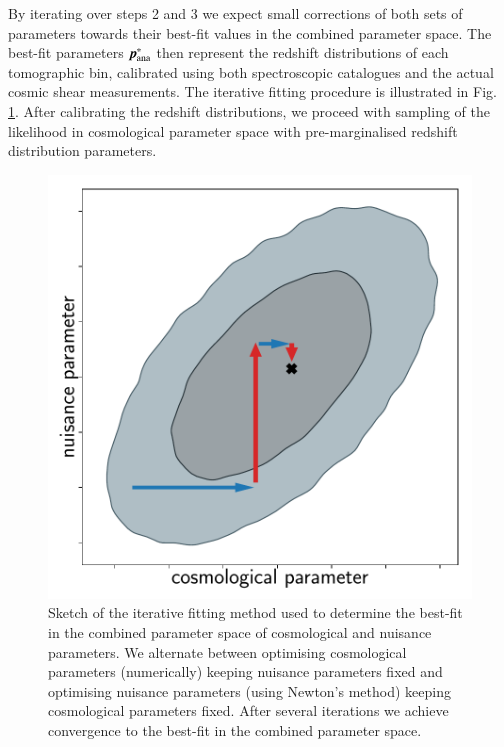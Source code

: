 \documentclass{aa}
\begin{document}
By iterating over steps 2 and 3 we expect small corrections of both sets of parameters towards their best-fit values in the combined parameter space. The best-fit parameters $\boldsymbol{p}^*_{\rm ana}$ then represent the redshift distributions of each tomographic bin, calibrated using both spectroscopic catalogues and the actual cosmic shear measurements. The iterative fitting procedure is illustrated in Fig. \ref{fig:iterative_calibration}. After calibrating the redshift distributions, we proceed with sampling of the likelihood in cosmological parameter space with pre-marginalised redshift distribution parameters.
\begin{figure}
\centering
\includegraphics[width=\linewidth]{plots/iterative.pdf}
\caption{Sketch of the iterative fitting method used to determine the best-fit in the combined parameter space of cosmological and nuisance parameters. We alternate between optimising cosmological parameters (numerically) keeping nuisance parameters fixed and optimising nuisance parameters (using Newton's method) keeping cosmological parameters fixed. After several iterations we achieve convergence to the best-fit in the combined parameter space.}
\label{fig:iterative_calibration}
\end{figure}
\end{document}

